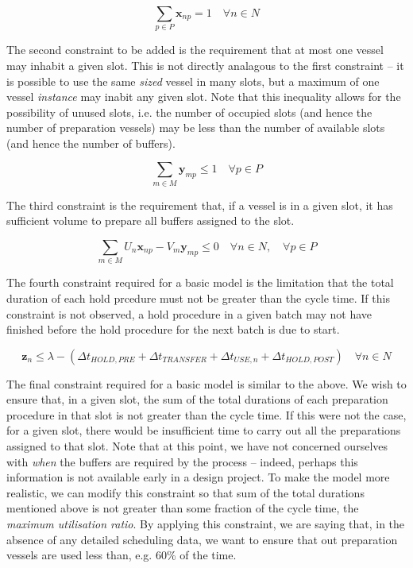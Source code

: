 \begin{equation}
    \sum_{p \in P} \boldsymbol{x}_{np} = 1 \quad \forall n \in N
\end{equation}

The second constraint to be added is the requirement that at most one vessel
may inhabit a given slot.
This is not directly analagous to the first constraint -- it is possible to 
use the same \emph{sized} vessel in many slots, but a maximum of one vessel 
\emph{instance} may inabit any given slot.
Note that this inequality allows for the possibility of unused slots, i.e. the
number of occupied slots (and hence the number of preparation vessels) may be
less than the number of available slots (and hence the number of buffers).

\begin{equation}
    \sum_{m \in M} \boldsymbol{y}_{mp} \le 1 \quad \forall p \in P
\end{equation}

The third constraint is the requirement that, if a vessel is in a given slot,
it has sufficient volume to prepare all buffers assigned to the slot.   
        
\begin{equation}
    \sum_{m \in M} U_{n} \boldsymbol{x}_{np} - V_{m} \boldsymbol{y}_{mp} \le 0
    \quad \forall n \in N, \quad \forall p \in P
\end{equation}

The fourth constraint required for a basic model is the limitation that the
total duration of each hold prcedure must not be greater than the cycle time.
If this constraint is not observed, a hold procedure in a given batch may not
have finished before the hold procedure for the next batch is due to start.

\begin{equation}
    \boldsymbol{z}_{n} \le \lambda - \left( \Delta t_{HOLD,PRE} +
    \Delta t_{TRANSFER} + \Delta t_{USE,n} + \Delta t_{HOLD,POST} \right)
    \quad \forall n \in N
\end{equation}


The final constraint required for a basic model is similar to the above.
We wish to ensure that, in a given slot, the sum of the total durations of each
preparation procedure in that slot is not greater than the cycle time.
If this were not the case, for a given slot, there would be insufficient
time to carry out all the preparations assigned to that slot.
Note that at this point, we have not concerned ourselves with \emph{when}
the buffers are required by the process -- indeed, perhaps this information is
not available early in a design project.
To make the model more realistic, we can modify this constraint so that sum of
the total durations mentioned above is not greater than some fraction of the
cycle time, the \emph{maximum utilisation ratio}.
By applying this constraint, we are saying that, in the absence of any detailed
scheduling data, we want to ensure that out preparation vessels
are used less than, e.g. 60\% of the time.

